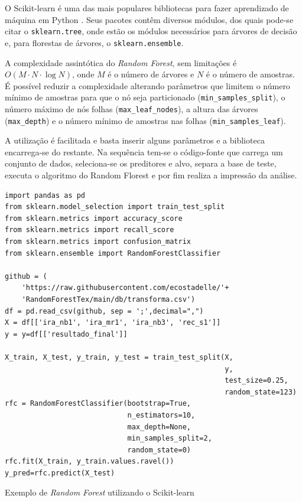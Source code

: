 \documentclass[12pt]{article}
\begin{document}
O Scikit-learn \cite{scikit-learn} é uma das mais populares bibliotecas para fazer aprendizado de máquina em Python \cite{Grus_2019}. Seus pacotes contêm diversos módulos, dos quais pode-se citar o \texttt{sklearn.tree}, onde estão os módulos necessários para árvores de decisão e, para florestas de árvores, o \texttt{sklearn.ensemble}.

A complexidade assintótica do \emph{Random Forest}, sem limitações é $O(M\cdot N \cdot\log{N})$, onde $M$ é o número de árvores e $N$ é o número de amostras. É possível reduzir a complexidade alterando parâmetros que limitem o número mínimo de amostras para que o nó seja particionado (\texttt{min\_samples\_split}), o número máximo de nós folhas (\texttt{max\_leaf\_nodes}), a altura das árvores (\texttt{max\_depth}) e o número mínimo de amostras nas folhas (\texttt{min\_samples\_leaf}).

A utilização é facilitada e basta inserir alguns parâmetros e a biblioteca encarrega-se do restante. Na sequência tem-se o código-fonte que carrega um conjunto de dados, seleciona-se os preditores e alvo, separa a base de teste, executa o algoritmo do Random Florest e por fim realiza a impressão da análise.


\begin{listing}[H]
\begin{verbatim}
import pandas as pd
from sklearn.model_selection import train_test_split
from sklearn.metrics import accuracy_score
from sklearn.metrics import recall_score
from sklearn.metrics import confusion_matrix
from sklearn.ensemble import RandomForestClassifier

github = (
    'https://raw.githubusercontent.com/ecostadelle/'+
    'RandomForestTex/main/db/transforma.csv')
df = pd.read_csv(github, sep = ';',decimal=",")
X = df[['ira_nb1', 'ira_mr1', 'ira_nb3', 'rec_s1']]
y = y=df[['resultado_final']]

X_train, X_test, y_train, y_test = train_test_split(X, 
                                                    y, 
                                                    test_size=0.25, 
                                                    random_state=123)
rfc = RandomForestClassifier(bootstrap=True,
                             n_estimators=10,
                             max_depth=None,
                             min_samples_split=2,
                             random_state=0)
rfc.fit(X_train, y_train.values.ravel())
y_pred=rfc.predict(X_test)
\end{verbatim}
\caption{Exemplo de \emph{Random Forest} utilizando o Scikit-learn}
\end{listing}
\end{document}
